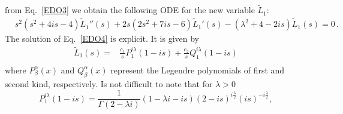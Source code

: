\documentclass[%
 aip,
 jmp,%
 amsmath,amssymb,
 reprint,%
]{revtex4-2}
\begin{document}
from Eq.~\eqref{EDO3} we obtain the following ODE for the new variable $\widetilde L_1$:
\begin{equation}\label{EDO4}
\begin{aligned}
& s^2 \left(s^2+4is -4\right) \widetilde L_1''(s) + 2s \left(2s^2+7is-6\right) \widetilde L_1'(s) - \left(\lambda^2+4 -2is\right)\widetilde L_1(s)=0\,.
\end{aligned}
\end{equation}
The solution of Eq.~\eqref{EDO4} is explicit. It is given by
\begin{equation}\label{eq:L1}
    \begin{aligned}
        	\widetilde L_1(s)=& \frac{c_1}{s}P_1^{i \lambda }(1-i s) + \frac{c_2}{s} Q_1^{i \lambda }(1-i s)\\
    \end{aligned}
\end{equation}
where $P^\alpha_\beta(x)$ and $Q^\alpha_\beta(x)$ represent the Legendre polynomials of first and second kind, respectively.
Is not difficult to note that for $\lambda >0$
\begin{equation}\label{eq: P_1ilambda}
    P_1^{i\lambda}(1-is)=\frac{1}{ \Gamma (2-\lambda i)} (1-\lambda i-i s) (2-i s)^{i\frac{\lambda}{2} } (i s)^{-i\frac{\lambda}{2}},%
\end{equation}
\end{document}

